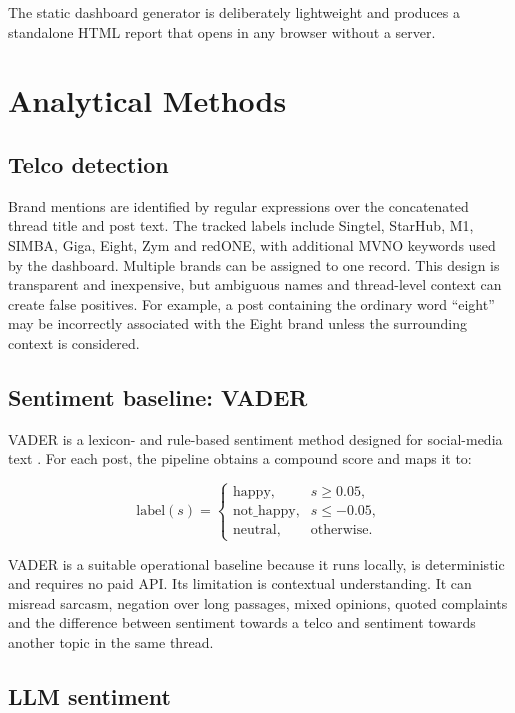 \documentclass[11pt,a4paper]{article}
\begin{document}
The static dashboard generator is deliberately lightweight and produces a standalone HTML report that opens in any browser without a server.

\section{Analytical Methods}

\subsection{Telco detection}

Brand mentions are identified by regular expressions over the concatenated thread title and post text. The tracked labels include Singtel, StarHub, M1, SIMBA, Giga, Eight, Zym and redONE, with additional MVNO keywords used by the dashboard. Multiple brands can be assigned to one record. This design is transparent and inexpensive, but ambiguous names and thread-level context can create false positives. For example, a post containing the ordinary word ``eight'' may be incorrectly associated with the Eight brand unless the surrounding context is considered.

\subsection{Sentiment baseline: VADER}

VADER is a lexicon- and rule-based sentiment method designed for social-media text \cite{hutto2014vader}. For each post, the pipeline obtains a compound score and maps it to:

\begin{equation}
\text{label}(s)=
\begin{cases}
\text{happy}, & s \geq 0.05,\\
\text{not\_happy}, & s \leq -0.05,\\
\text{neutral}, & \text{otherwise}.
\end{cases}
\end{equation}

VADER is a suitable operational baseline because it runs locally, is deterministic and requires no paid API. Its limitation is contextual understanding. It can misread sarcasm, negation over long passages, mixed opinions, quoted complaints and the difference between sentiment towards a telco and sentiment towards another topic in the same thread.

\subsection{LLM sentiment}
\end{document}
